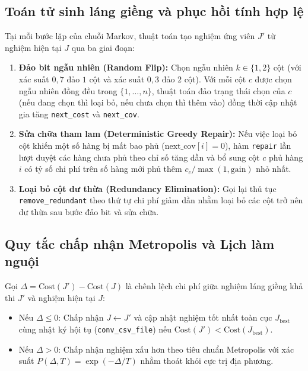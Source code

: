 \documentclass[11pt, a4paper]{article}
\begin{document}
\subsection{Toán tử sinh láng giềng và phục hồi tính hợp lệ}
Tại mỗi bước lặp của chuỗi Markov, thuật toán tạo nghiệm ứng viên $J'$ từ nghiệm hiện tại $J$ qua ba giai đoạn:
\begin{enumerate}
    \item \textbf{Đảo bit ngẫu nhiên (Random Flip):} Chọn ngẫu nhiên $k \in \{1, 2\}$ cột (với xác suất $0{,}7$ đảo $1$ cột và xác suất $0{,}3$ đảo $2$ cột). Với mỗi cột $c$ được chọn ngẫu nhiên đồng đều trong $\{1, \dots, n\}$, thuật toán đảo trạng thái chọn của $c$ (nếu đang chọn thì loại bỏ, nếu chưa chọn thì thêm vào) đồng thời cập nhật gia tăng \texttt{next\_cost} và \texttt{next\_cov}.
    \item \textbf{Sửa chữa tham lam (Deterministic Greedy Repair):} Nếu việc loại bỏ cột khiến một số hàng bị mất bao phủ ($\text{next\_cov}[i] = 0$), hàm \texttt{repair} lần lượt duyệt các hàng chưa phủ theo chỉ số tăng dần và bổ sung cột $c$ phủ hàng $i$ có tỷ số chi phí trên số hàng mới phủ thêm $c_c / \max(1, \text{gain})$ nhỏ nhất.
    \item \textbf{Loại bỏ cột dư thừa (Redundancy Elimination):} Gọi lại thủ tục \texttt{remove\_redundant} theo thứ tự chi phí giảm dần nhằm loại bỏ các cột trở nên dư thừa sau bước đảo bit và sửa chữa.
\end{enumerate}

\subsection{Quy tắc chấp nhận Metropolis và Lịch làm nguội}
Gọi $\Delta = \text{Cost}(J') - \text{Cost}(J)$ là chênh lệch chi phí giữa nghiệm láng giềng khả thi $J'$ và nghiệm hiện tại $J$:
\begin{itemize}
    \item Nếu $\Delta \le 0$: Chấp nhận $J \leftarrow J'$ và cập nhật nghiệm tốt nhất toàn cục $J_{\text{best}}$ cùng nhật ký hội tụ (\texttt{conv\_csv\_file}) nếu $\text{Cost}(J') < \text{Cost}(J_{\text{best}})$.
    \item Nếu $\Delta > 0$: Chấp nhận nghiệm xấu hơn theo tiêu chuẩn Metropolis với xác suất $P(\Delta, T) = \exp(-\Delta / T)$ nhằm thoát khỏi cực trị địa phương.
\end{itemize}
\end{document}
